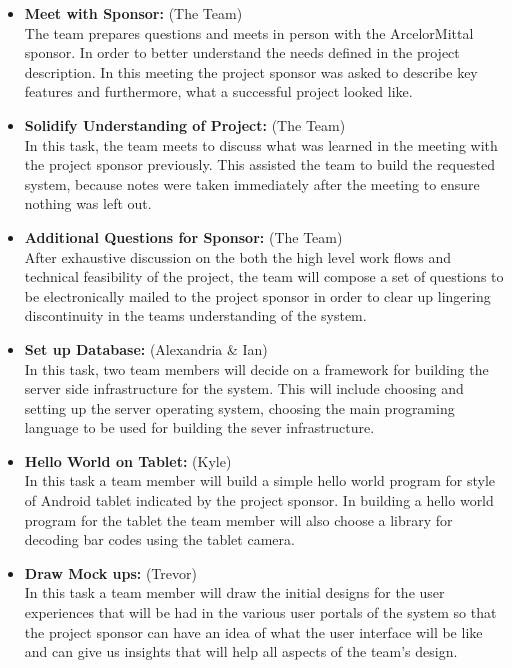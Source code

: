 \documentclass[Letter,11pt]{article}
\begin{document}
		\begin{itemize}
			\item\textbf{Meet with Sponsor:} (The Team)\\
			The team prepares questions and meets in person with the ArcelorMittal sponsor. In order to better understand the needs defined in the project description. In this meeting the project sponsor was asked to describe key features and furthermore, what a successful project looked like.
			
			\item \textbf{Solidify Understanding of Project:} (The Team)\\
			In this task, the team meets to discuss what was learned in the meeting with the project sponsor previously. This assisted the team to build the requested system, because notes were taken immediately after the meeting to ensure nothing was left out. 
			
			\item\textbf{Additional Questions for Sponsor:} (The Team)\\
			After exhaustive discussion on the both the high level work flows and technical feasibility of the project, the team will compose a set of questions to be electronically mailed to the project sponsor in order to clear up lingering discontinuity in the teams understanding of the system.
			
			\item\textbf{Set up Database:} (Alexandria \& Ian)\\
			In this task,  two team members will decide on a framework for building the server side infrastructure for the system. This will include choosing and setting up the server operating system, choosing the main programing language to be used for building the sever infrastructure.
			
			\item\textbf{Hello World on Tablet:} (Kyle)\\
			In this task a team member will build a simple hello world program for style of Android tablet indicated by the project sponsor. In building a hello world program for the tablet the team member will also choose a library for decoding bar codes using the tablet camera. 
			
			\item\textbf{Draw Mock ups:} (Trevor)\\
			In this task a team member will draw the initial designs for the user experiences that will be had in the various user portals of the system so that the project sponsor can have an idea of what the user interface will be like and can give us insights that will help all aspects of the team's design. 
			

\end{itemize}
\end{document}
